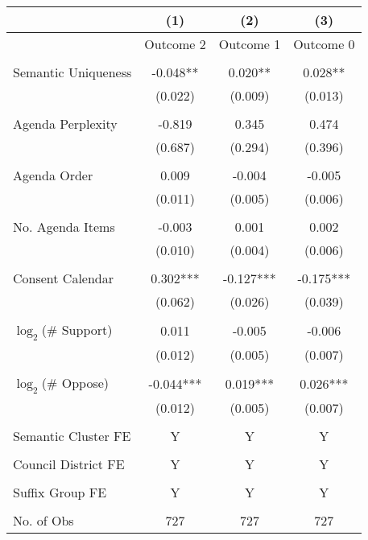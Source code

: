 \begin{tabular}{lccc}
\toprule
 & (1) & (2) & (3) \\
\midrule
 & Outcome 2 & Outcome 1 & Outcome 0 \\
 &  &  &  \\
Semantic Uniqueness & -0.048** & 0.020** & 0.028** \\
 & (0.022) & (0.009) & (0.013) \\
 &  &  &  \\
Agenda Perplexity & -0.819 & 0.345 & 0.474 \\
 & (0.687) & (0.294) & (0.396) \\
 &  &  &  \\
Agenda Order & 0.009 & -0.004 & -0.005 \\
 & (0.011) & (0.005) & (0.006) \\
 &  &  &  \\
No. Agenda Items & -0.003 & 0.001 & 0.002 \\
 & (0.010) & (0.004) & (0.006) \\
 &  &  &  \\
Consent Calendar & 0.302*** & -0.127*** & -0.175*** \\
 & (0.062) & (0.026) & (0.039) \\
 &  &  &  \\
$\log_2$(\# Support) & 0.011 & -0.005 & -0.006 \\
 & (0.012) & (0.005) & (0.007) \\
 &  &  &  \\
$\log_2$(\# Oppose) & -0.044*** & 0.019*** & 0.026*** \\
 & (0.012) & (0.005) & (0.007) \\
 &  &  &  \\
Semantic Cluster FE & Y & Y & Y \\
 &  &  &  \\
Council District FE & Y & Y & Y \\
 &  &  &  \\
Suffix Group FE & Y & Y & Y \\
 &  &  &  \\
No. of Obs & 727 & 727 & 727 \\
\bottomrule
\end{tabular}
